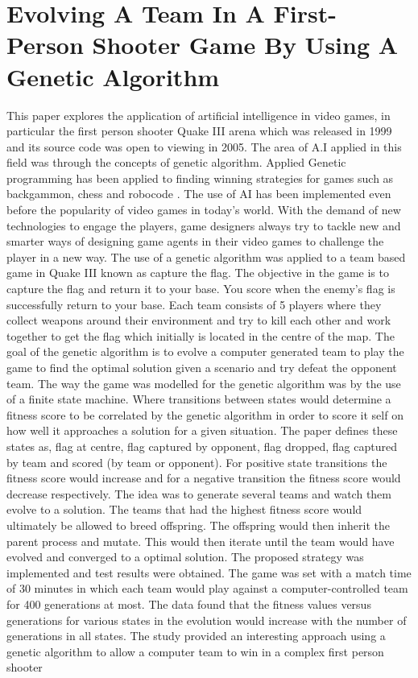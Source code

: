 \documentclass[12pt]{article} %
\begin{document}
\newpage
\section{Evolving A Team In A First-Person Shooter Game By Using A Genetic Algorithm} %
This paper explores the application of artificial intelligence in video games, in particular the first person shooter Quake III arena which was released in 1999 and its source code was open to viewing in 2005. The area of A.I applied in this field was through the concepts of genetic algorithm. Applied Genetic programming has been applied to finding winning strategies for games such as backgammon, chess and robocode \cite{Sipper}. The use of AI has been implemented even before the popularity of video games in today’s world. With the demand of new technologies to engage the players, game designers always try to tackle new and smarter ways of designing game agents in their video games to challenge the player in a new way. The use of a genetic algorithm was applied to a team based game in Quake III known as capture the flag. The objective in the game is to capture the flag and return it to your base. You score when the enemy’s flag is successfully return to your base. Each team consists of 5 players where they collect weapons around their environment and try to kill each other and work together to get the flag which initially is located in the centre of the map. The goal of the genetic algorithm is to evolve a computer generated team to play the game to find the optimal solution given a scenario and try defeat the opponent team. The way the game was modelled for the genetic algorithm was by the use of a finite state machine. Where transitions between states would determine a fitness score to be correlated by the genetic algorithm in order to score it self on how well it approaches a solution for a given situation. The paper defines these states as, flag at centre, flag captured by opponent, flag dropped, flag captured by team and scored (by team or opponent). For positive state transitions the fitness score would increase and for a negative transition the fitness score would decrease respectively. The idea was to generate several teams and watch them evolve to a solution. The teams that had the highest fitness score would ultimately be allowed to breed offspring. The offspring would then inherit the parent process and mutate. This would then iterate until the team would have evolved and converged to a optimal solution. The proposed strategy was implemented and test results were obtained. The game was set with a match time of 30 minutes in which each team would play against a computer-controlled team for 400 generations at most. The data found that the fitness values versus generations for various states in the evolution would increase with the number of generations in all states. The study provided an interesting approach using a genetic algorithm to allow a computer team to win in a complex first person shooter 
\end{document}
